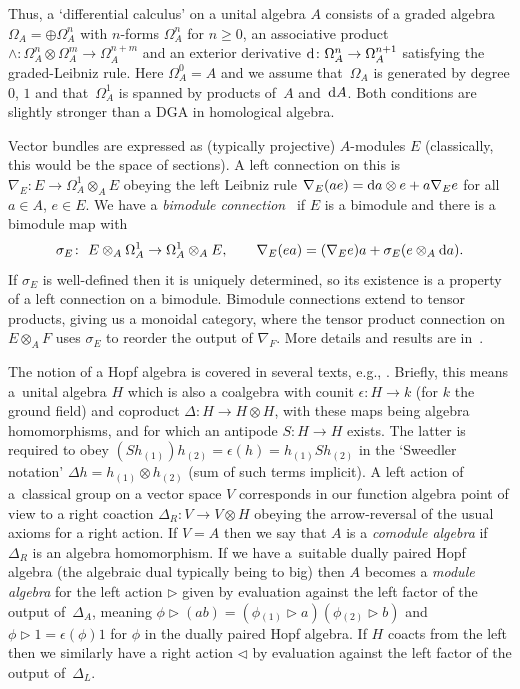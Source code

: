 \documentclass[10pt,a4paper]{amsart}
\numberwithin{equation}{section}
\newcommand{\<}{{\langle}}
\renewcommand{\>}{{\rangle}}
\newcommand{\tens}{\otimes}
\renewcommand{\o}{{}_{\scriptstyle(1)}}
\renewcommand{\t}{{}_{\scriptstyle(2)}}
\newcommand{\extd}{{\rm d}}
\newcommand{\eps}{\epsilon}
\newcommand{\la}{{\triangleright}}
\newcommand{\ra}{{\triangleleft}}
\begin{document}
Thus, a `differential calculus' on a unital algebra $A$ consists of a graded algebra $\Omega_A=\oplus\Omega^n_A$ with $n$-forms $\Omega^n_A$ for $n\geq 0$, an associative product $\wedge\colon \Omega^n_A\tens\Omega^m_A\rightarrow\Omega^{n+m}_A$ and an exterior derivative $\extd\colon \Omega^n_A\rightarrow\Omega^{n+1}_A$ satisfying the graded-Leibniz rule. Here $\Omega^0_A=A$ and we assume that~$\Omega_A$ is generated by degree $0$, $1$ and that~$\Omega^1_A$ is spanned by products of~$A$ and~$\extd A$. Both conditions are slightly stronger than a DGA in homological algebra.

Vector bundles are expressed as (typically projective) $A$-modules $E$ (classically, this would be the space of sections). A left connection on this is $\nabla_E\colon E\rightarrow\Omega^1_A\tens_AE$ obeying the left Leibniz rule $\nabla_E(ae)=\extd a\tens e+a\nabla_Ee$ for all $a\in A$, $e\in E$. We have a {\em bimodule connection}~\cite{DVM,Mou} if $E$ is a bimodule and there is a bimodule map with
\[ \sigma_E\colon \ E\tens_A\Omega^1_A\rightarrow\Omega^1_A\tens_AE, \qquad \nabla_E(ea)=(\nabla_Ee)a+\sigma_E(e\tens_A\extd a).\]
If $\sigma_E$ is well-defined then it is uniquely determined, so its existence is a property of a left connection on a bimodule. Bimodule connections extend to tensor products, giving us a monoidal category, where the tensor product connection on $E\tens_A F$ uses $\sigma_E$ to reorder the output of $\nabla_F$. More details and results are in~\cite{BegMa}.

The notion of a Hopf algebra is covered in several texts, e.g., \cite{Ma:book}. Briefly, this means a~unital algebra $H$ which is also a coalgebra with counit $\eps\colon H\to k$ (for $k$ the ground field) and coproduct $\Delta\colon H\to H\tens H$, with these maps being algebra homomorphisms, and for which an antipode $S\colon H\to H$ exists. The latter is required to obey $(Sh\o)h\t=\eps(h)=h\o Sh\t$ in the `Sweedler notation' $\Delta h=h\o\tens h\t$ (sum of such terms implicit). A left action of a~classical group on a vector space $V$ corresponds in our function algebra point of view to a right coaction $\Delta_R\colon V\to V\tens H$ obeying the arrow-reversal of the usual axioms for a right action. If $V=A$ then we say that $A$ is a {\em comodule algebra} if $\Delta_R$ is an algebra homomorphism. If we have a~suitable dually paired Hopf algebra (the algebraic dual typically being to big) then $A$ becomes a {\em module algebra} for the left action $\la$ given by evaluation against the left factor of the output of~$\Delta_A$, meaning $\phi\la(ab)=(\phi\o\la a)(\phi\t\la b)$ and $\phi\la 1=\eps(\phi)1$ for $\phi$ in the dually paired Hopf algebra. If $H$ coacts from the left then we similarly have a right action $\ra$ by evaluation against the left factor of the output of~$\Delta_L$.
\end{document}
